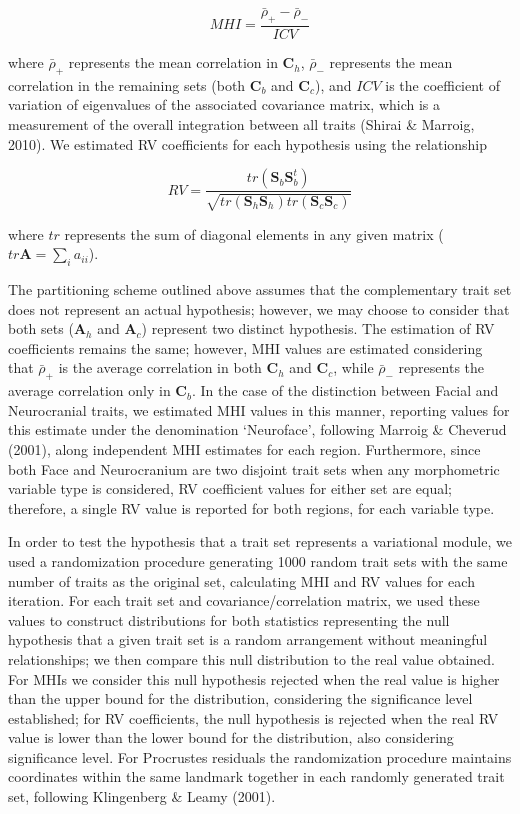 \documentclass[12pt,twoside]{report}
\begin{document}
\begin{equation}
MHI = \frac {\bar{\rho}_{+} - \bar{\rho}_{-}} {ICV}
\label{eq:mi}
\end{equation}

where $\bar{\rho}_{+}$ represents the mean correlation in
$\mathbf{C}_h$, $\bar{\rho}_{-}$ represents the mean correlation in the
remaining sets (both $\mathbf{C}_b$ and $\mathbf{C}_c$), and $ICV$ is
the coefficient of variation of eigenvalues of the associated covariance
matrix, which is a measurement of the overall integration between all
traits (Shirai \& Marroig, 2010). We estimated RV coefficients for each
hypothesis using the relationship

\begin{equation}
RV = \frac{tr(\mathbf{S}_{b}\mathbf{S}^t_{b})}{\sqrt{tr(\mathbf{S}_h \mathbf{S}_h)tr(\mathbf{S}_c \mathbf{S}_c)}}
\label{eq:rv}
\end{equation}

where $tr$ represents the sum of diagonal elements in any given matrix
($tr \mathbf{A} = \sum_i a_{ii}$).

The partitioning scheme outlined above assumes that the complementary
trait set does not represent an actual hypothesis; however, we may
choose to consider that both sets ($\mathbf{A}_h$ and $\mathbf{A}_c$)
represent two distinct hypothesis. The estimation of RV coefficients
remains the same; however, MHI values are estimated considering that
$\bar{\rho}_{+}$ is the average correlation in both $\mathbf{C}_h$ and
$\mathbf{C}_c$, while $\bar{\rho}_{-}$ represents the average
correlation only in $\mathbf{C}_b$. In the case of the distinction
between Facial and Neurocranial traits, we estimated MHI values in this
manner, reporting values for this estimate under the denomination
`Neuroface', following Marroig \& Cheverud (2001), along independent MHI
estimates for each region. Furthermore, since both Face and Neurocranium
are two disjoint trait sets when any morphometric variable type is
considered, RV coefficient values for either set are equal; therefore, a
single RV value is reported for both regions, for each variable type.

In order to test the hypothesis that a trait set represents a
variational module, we used a randomization procedure generating 1000
random trait sets with the same number of traits as the original set,
calculating MHI and RV values for each iteration. For each trait set and
covariance/correlation matrix, we used these values to construct
distributions for both statistics representing the null hypothesis that
a given trait set is a random arrangement without meaningful
relationships; we then compare this null distribution to the real value
obtained. For MHIs we consider this null hypothesis rejected when the
real value is higher than the upper bound for the distribution,
considering the significance level established; for RV coefficients, the
null hypothesis is rejected when the real RV value is lower than the
lower bound for the distribution, also considering significance level.
For Procrustes residuals the randomization procedure maintains
coordinates within the same landmark together in each randomly generated
trait set, following Klingenberg \& Leamy (2001).
\end{document}

